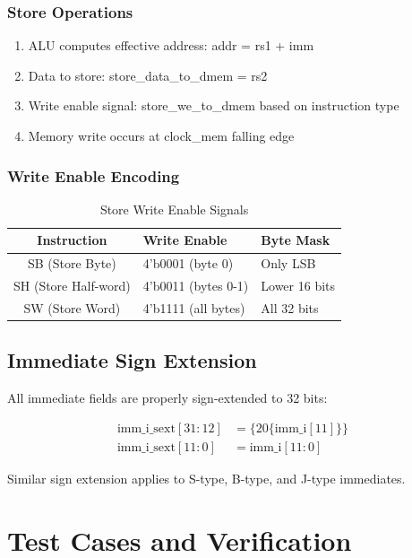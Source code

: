 \documentclass[a4paper, 11pt]{article}
\begin{document}
\subsubsection{Store Operations}
\begin{enumerate}
    \item ALU computes effective address: addr = rs1 + imm
    \item Data to store: store\_data\_to\_dmem = rs2
    \item Write enable signal: store\_we\_to\_dmem based on instruction type
    \item Memory write occurs at clock\_mem falling edge
\end{enumerate}

\subsubsection{Write Enable Encoding}
\begin{table}[H]
\centering
\caption{Store Write Enable Signals}
\begin{tabular}{|c|l|l|}
\hline
\textbf{Instruction} & \textbf{Write Enable} & \textbf{Byte Mask} \\
\hline
SB (Store Byte) & 4'b0001 (byte 0) & Only LSB \\
\hline
SH (Store Half-word) & 4'b0011 (bytes 0-1) & Lower 16 bits \\
\hline
SW (Store Word) & 4'b1111 (all bytes) & All 32 bits \\
\hline
\end{tabular}
\end{table}

\subsection{Immediate Sign Extension}

All immediate fields are properly sign-extended to 32 bits:

\begin{align}
\text{imm\_i\_sext}[31:12] &= \{20\{\text{imm\_i}[11]\}\} \\
\text{imm\_i\_sext}[11:0] &= \text{imm\_i}[11:0]
\end{align}

Similar sign extension applies to S-type, B-type, and J-type immediates.

\newpage

\section{Test Cases and Verification}
\end{document}
